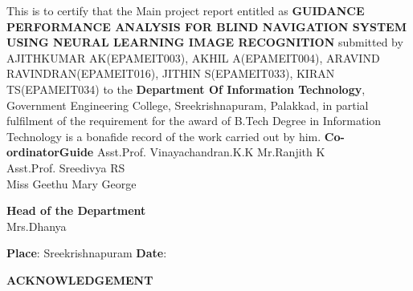 \documentclass[10pt,a4paper,twoside]{report}
\newcommand\blankpage{
	\null
	\thispagestyle{empty}
	\addtocounter{page}{-1}
	\newpage}
\begin{document}
 This is to certify  that  the  Main project  report entitled  as  {\bf GUIDANCE PERFORMANCE ANALYSIS FOR BLIND NAVIGATION SYSTEM USING NEURAL LEARNING IMAGE RECOGNITION }  submitted by AJITHKUMAR AK(EPAMEIT003), AKHIL A(EPAMEIT004), ARAVIND RAVINDRAN(EPAMEIT016), JITHIN S(EPAMEIT033), KIRAN TS(EPAMEIT034) to the {\bf Department   Of   Information Technology}, Government Engineering College, Sreekrishnapuram, Palakkad, in partial fulfilment of the requirement for the award of B.Tech Degree in Information Technology is a bonafide record of the work carried out by him.
\newline
\newline
\textbf{Co-ordinator}\hspace{9.9cm}\textbf{Guide}
\newline
Asst.Prof. Vinayachandran.K.K \hspace{6.2cm}Mr.Ranjith K
\\
Asst.Prof. Sreedivya RS\\
Miss Geethu Mary George 
\newline
\\
 \begin{center}
 \textbf{Head of the Department}
 \\
Mrs.Dhanya 
\end{center}

\begin{flushleft}

{\bf Place}: Sreekrishnapuram
\newline 
{\bf Date}:\hspace{.1cm}
\end{flushleft}


\newpage
{}
\blankpage
\newpage
{}
\setcounter{page}{0}
\begin{center}
\begin{Large}
\textbf{ACKNOWLEDGEMENT}
\end{Large}
\end{center}
\end{document}
